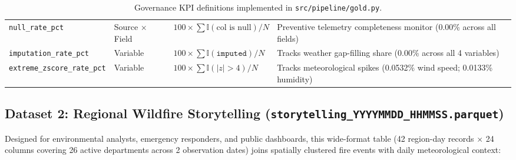 \documentclass[11pt,letterpaper]{article}
\begin{document}
\begin{table}[H]
\begin{tabularx}{\textwidth}{>{\raggedright\arraybackslash}p{3.8cm} >{\raggedright\arraybackslash}p{2.3cm} >{\raggedright\arraybackslash}X >{\raggedright\arraybackslash}p{3.0cm}}
    \addlinespace
    \texttt{null\_rate\_pct} & Source $\times$ Field & $100 \times \sum \mathbb{I}(\text{col is null}) / N$ & Preventive telemetry completeness monitor (0.00\% across all fields) \\
    \addlinespace
    \texttt{imputation\_rate\_pct} & Variable & $100 \times \sum \mathbb{I}(\texttt{imputed}) / N$ & Tracks weather gap-filling share (0.00\% across all 4 variables) \\
    \addlinespace
    \texttt{extreme\_zscore\_rate\_pct} & Variable & $100 \times \sum \mathbb{I}(|z|>4) / N$ & Tracks meteorological spikes (0.0532\% wind speed; 0.0133\% humidity) \\
    \bottomrule
  \end{tabularx}
  \caption{Governance KPI definitions implemented in \texttt{src/pipeline/gold.py}.}
  \label{tab:governance_kpis}
\end{table}

\subsection{Dataset 2: Regional Wildfire Storytelling (\texttt{storytelling\_YYYYMMDD\_HHMMSS.parquet})}

Designed for environmental analysts, emergency responders, and public dashboards, this wide-format table (42 region-day records $\times$ 24 columns covering 26 active departments across 2 observation dates) joins spatially clustered fire events with daily meteorological context:
\end{document}
